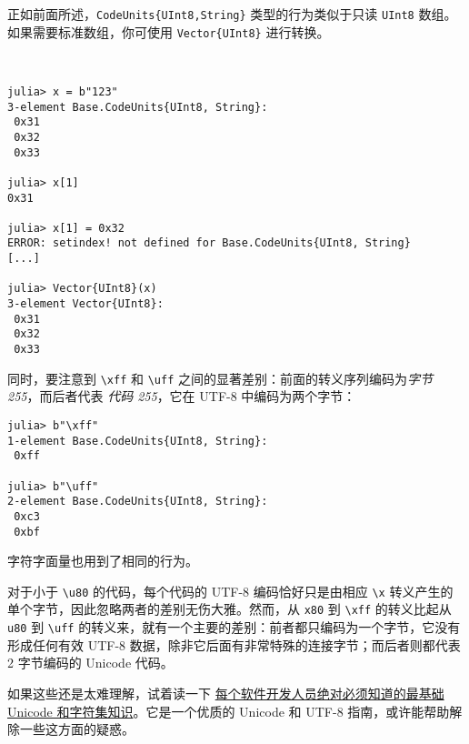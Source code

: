 正如前面所述，\texttt{CodeUnits\{UInt8,String\}} 类型的行为类似于只读 \texttt{UInt8} 数组。如果需要标准数组，你可使用 \texttt{Vector\{UInt8\}} 进行转换。



 




\begin{verbatim}
julia> x = b"123"
3-element Base.CodeUnits{UInt8, String}:
 0x31
 0x32
 0x33

julia> x[1]
0x31

julia> x[1] = 0x32
ERROR: setindex! not defined for Base.CodeUnits{UInt8, String}
[...]

julia> Vector{UInt8}(x)
3-element Vector{UInt8}:
 0x31
 0x32
 0x33
\end{verbatim}



同时，要注意到 \texttt{{\textbackslash}xff} 和 \texttt{{\textbackslash}uff} 之间的显著差别：前面的转义序列编码为\emph{字节 255}，而后者代表 \emph{代码 255}，它在 UTF-8 中编码为两个字节：




\begin{verbatim}
julia> b"\xff"
1-element Base.CodeUnits{UInt8, String}:
 0xff

julia> b"\uff"
2-element Base.CodeUnits{UInt8, String}:
 0xc3
 0xbf
\end{verbatim}



字符字面量也用到了相同的行为。



对于小于 \texttt{{\textbackslash}u80} 的代码，每个代码的 UTF-8 编码恰好只是由相应 \texttt{{\textbackslash}x} 转义产生的单个字节，因此忽略两者的差别无伤大雅。然而，从 \texttt{x80} 到 \texttt{{\textbackslash}xff} 的转义比起从 \texttt{u80} 到 \texttt{{\textbackslash}uff} 的转义来，就有一个主要的差别：前者都只编码为一个字节，它没有形成任何有效 UTF-8 数据，除非它后面有非常特殊的连接字节；而后者则都代表 2 字节编码的 Unicode 代码。



如果这些还是太难理解，试着读一下 \href{https://www.joelonsoftware.com/2003/10/08/the-absolute-minimum-every-software-developer-absolutely-positively-must-know-about-unicode-and-character-sets-no-excuses/}{{\textquotedbl}每个软件开发人员绝对必须知道的最基础 Unicode 和字符集知识{\textquotedbl}}。它是一个优质的 Unicode 和 UTF-8 指南，或许能帮助解除一些这方面的疑惑。



